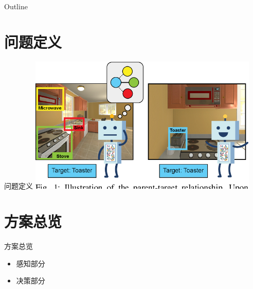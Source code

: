 \begin{frame}{Outline}
    \tableofcontents
\end{frame}

\section{问题定义}
\begin{frame}{问题定义}
    \centering
    \includegraphics[width=11cm,trim=0 20 0 0,clip]{assets/problem.png}
\end{frame}



\section{方案总览}
\begin{frame}{方案总览}
    \begin{itemize}
        \item 感知部分
        \item 决策部分
    \end{itemize}
\end{frame}

